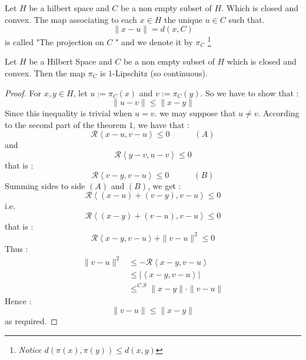\begin{definition}[]
Let $H $ be a hilbert space and 
$C $ be a non empty subset of $H$. 
Which is closed and convex. 
The map associating to each $x \in  H $
the unique $u \in  C $ such that. 
\[
\| x-u \| = d(x,C) 
\]
is called "The projection on $C $ " and we denote
it by $\pi _{C} $ \footnote {
  \it Notice $d(\pi (x) , \pi (y) ) 
  \leq d(x,y) $ }
\end{definition}
\begin{theorem}[]
Let $H $ be a Hilbert Space and 
$C $ be a non empty subset of $H $ 
which is closed and convex. Then the map
$\pi _{C} $ is $1 $-Lipschitz (so continuous).
\end{theorem}
\begin{proof}
For $x,y \in  H $, let $ u := 
\pi _{C}(x) $ and $v := \pi _{C}(y)  $. 
So we have to show that : 
\[
\| u-v \|  
\leq \| x-y \| 
\]
Since this inequality is trivial when $u=v $. 
we may suppose that $u \neq v $. According to the 
second part of the theorem $1 $, we have that : 
\[
\mathcal{R} \left\langle x-u, v-u \right\rangle  
\leq 0 \quad 
\quad 
\quad (A) 
\]
and 
\[
\mathcal{R} 
\left\langle 
  y-v, u-v
\right\rangle  
\leq 0
\]
that is : 
\[
\mathcal{R} 
\left\langle 
  v-y, v-u
\right\rangle  
\leq 0  \quad \quad \quad 
(B) 
\]
Summing sides to side $(A) $ and 
$(B)$, we get : 
\[
\mathcal{R}  
\left\langle 
  (x-u) + (v-y), 
  v-u
\right\rangle  
\leq 0
\]
i.e. 
\[
\mathcal{R} \left\langle 
  (x-y) + (v-u), v-u 
\right\rangle  \leq 0
\]
that is : 
\[
  \mathcal{R} 
  \left\langle 
    x-y, v-u
  \right\rangle  + 
  \| v-u \| ^2  \leq  0
\]
Thus : 
\begin{align*}
\| v-u \| ^2 
& \leq 
- \mathcal{R} \left\langle 
  x-y, v-u
\right\rangle  \\
& \leq 
\left| 
\left\langle x-y, v-u \right\rangle 
\right| \\
& \leq^{C.S} 
 \| x-y \| \cdot 
 \| v-u \| 
\end{align*}
Hence : 
\[
\| v-u \|  
\leq \| x - y \| 
\]
as required.
\end{proof}
